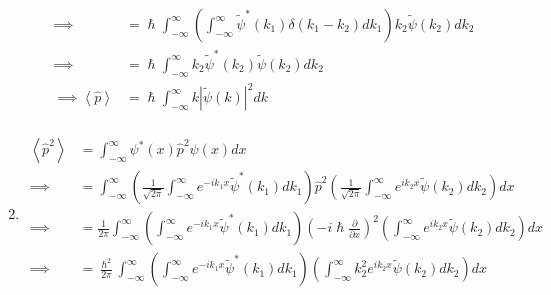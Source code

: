 \documentclass[addpoints]{exam}
\begin{document}
\begin{questions}
\begin{solution}
\begin{enumerate}
\begin{equation*}
\begin{aligned}
                          \implies                      & = \hslash\int_{-\infty}^{\infty} \left(\int_{-\infty}^{\infty}\tilde{\psi}^*(k_1)\delta(k_1-k_2)dk_1\right)k_2 \tilde{\psi}(k_2) dk_2                                                                                                 \\
                          \implies                      & = \hslash\int_{-\infty}^{\infty} k_2 \tilde{\psi}^*(k_2) \tilde{\psi}(k_2) dk_2                                                                                                                                                       \\
                          \implies \left<\hat{p}\right> & = \hslash\int_{-\infty}^{\infty} k \left|\tilde{\psi}(k)\right|^2 dk                                                                                                                                                                  \\
                      \end{aligned}
                  \end{equation*}
                  \pagebreak
            \item \begin{equation*}
                      \begin{aligned}
                          \left<\hat{p}^2\right>          & = \int_{-\infty}^{\infty} \psi^*(x)\hat{p}^2\psi(x) dx                                                                                                                                                                                  \\
                          \implies                        & = \int_{-\infty}^{\infty} \left(\frac{1}{\sqrt{2\pi}}\int_{-\infty}^{\infty}e^{-ik_1x}\tilde{\psi}^*(k_1)dk_1\right)\hat{p}^2\left(\frac{1}{\sqrt{2\pi}}\int_{-\infty}^{\infty}e^{ik_2x}\tilde{\psi}(k_2)dk_2\right) dx                 \\
                          \implies                        & = \frac{1}{2\pi}\int_{-\infty}^{\infty} \left(\int_{-\infty}^{\infty}e^{-ik_1x}\tilde{\psi}^*(k_1)dk_1\right)\left(-i\hslash \frac{\partial}{\partial x} \right)^2\left(\int_{-\infty}^{\infty}e^{ik_2x}\tilde{\psi}(k_2)dk_2\right) dx \\
                          \implies                        & = \frac{\hslash^2}{2\pi}\int_{-\infty}^{\infty} \left(\int_{-\infty}^{\infty}e^{-ik_1x}\tilde{\psi}^*(k_1)dk_1\right)\left(\int_{-\infty}^{\infty}k_2^2e^{ik_2x}\tilde{\psi}(k_2)dk_2\right) dx                                         \\

\end{aligned}
\end{equation*}
\end{enumerate}
\end{solution}
\end{questions}
\end{document}
